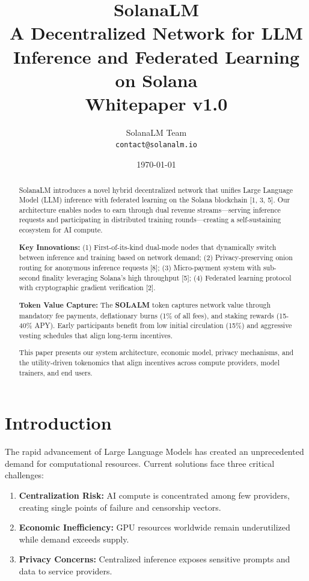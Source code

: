\documentclass[11pt,a4paper]{article}
\title{
    \textbf{\Huge SolanaLM} \\[0.5cm]
    \Large A Decentralized Network for LLM Inference and Federated Learning on Solana \\[1cm]
    \large Whitepaper v1.0
}
\author{
    SolanaLM Team \\
    \texttt{contact@solanalm.io}
}
\date{\today}
\begin{document}
\maketitle
\thispagestyle{empty}

\begin{abstract}
\noindent
SolanaLM introduces a novel hybrid decentralized network that unifies Large Language Model (LLM) inference with federated learning on the Solana blockchain [1, 3, 5]. Our architecture enables nodes to earn through dual revenue streams—serving inference requests and participating in distributed training rounds—creating a self-sustaining ecosystem for AI compute.

\textbf{Key Innovations:} (1) First-of-its-kind dual-mode nodes that dynamically switch between inference and training based on network demand; (2) Privacy-preserving onion routing for anonymous inference requests [8]; (3) Micro-payment system with sub-second finality leveraging Solana's high throughput [5]; (4) Federated learning protocol with cryptographic gradient verification [2].

\textbf{Token Value Capture:} The \textbf{SOLALM} token captures network value through mandatory fee payments, deflationary burns (1\% of all fees), and staking rewards (15-40\% APY). Early participants benefit from low initial circulation (15\%) and aggressive vesting schedules that align long-term incentives.

This paper presents our system architecture, economic model, privacy mechanisms, and the utility-driven tokenomics that align incentives across compute providers, model trainers, and end users.
\end{abstract}

\newpage
\tableofcontents
\newpage

\section{Introduction}

The rapid advancement of Large Language Models has created an unprecedented demand for computational resources. Current solutions face three critical challenges:

\begin{enumerate}
    \item \textbf{Centralization Risk:} AI compute is concentrated among few providers, creating single points of failure and censorship vectors.
    \item \textbf{Economic Inefficiency:} GPU resources worldwide remain underutilized while demand exceeds supply.
    \item \textbf{Privacy Concerns:} Centralized inference exposes sensitive prompts and data to service providers.
\end{enumerate}
\end{document}
